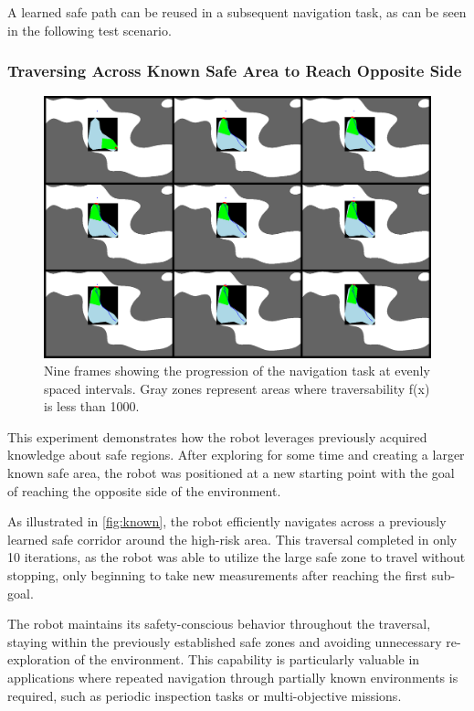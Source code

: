 A learned safe path can be reused in a subsequent navigation task, as can be seen in the following test scenario.

\subsubsection{Traversing Across Known Safe Area to Reach Opposite Side}
\begin{figure}[h]
    \centering
    \includegraphics[width=1\linewidth]{figures/known.png}
    \caption{Nine frames showing the progression of the navigation task at evenly spaced intervals. Gray zones represent areas where traversability f(x) is less than 1000.}
    \label{fig:known}
\end{figure}

This experiment demonstrates how the robot leverages previously acquired knowledge about safe regions. After exploring for some time and creating a larger known safe area, the robot was positioned at a new starting point with the goal of reaching the opposite side of the environment.

As illustrated in \autoref{fig:known}, the robot efficiently navigates across a previously learned safe corridor around the high-risk area. This traversal completed in only 10 iterations, as the robot was able to utilize the large safe zone to travel without stopping, only beginning to take new measurements after reaching the first sub-goal. 

The robot maintains its safety-conscious behavior throughout the traversal, staying within the previously established safe zones and avoiding unnecessary re-exploration of the environment. This capability is particularly valuable in applications where repeated navigation through partially known environments is required, such as periodic inspection tasks or multi-objective missions.

